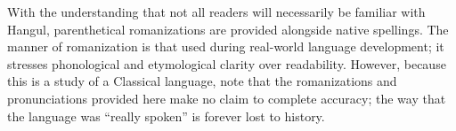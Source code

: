 With the understanding that not all readers will necessarily be familiar with Hangul, parenthetical romanizations are provided alongside native spellings.
The manner of romanization is that used during real-world language development; it stresses phonological and etymological clarity over readability.
However, because this is a study of a Classical language, note that the romanizations and pronunciations provided here make no claim to complete accuracy; the way that the language was “really spoken” is forever lost to history.
